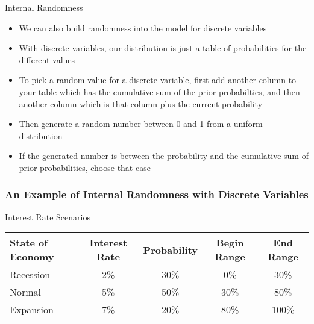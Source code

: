 \documentclass[handout, 11pt]{beamer}
\begin{document}
\begin{section}{Internal Randomness}
\begin{frame}
\begin{itemize}
\item We can also build randomness into the model for discrete variables
\vfill
\item With discrete variables, our distribution is just a table of probabilities for the different values
\vfill
\item To pick a random value for a discrete variable, first add another column to your table which has the cumulative sum of the prior probabilties, and then another column which is that column plus the current probability
\vfill
\item Then generate a random number between 0 and 1 from a uniform distribution
\vfill
\item If the generated number is between the probability and the cumulative sum of prior probabilities, choose that case
\end{itemize}
\end{frame}
\begin{frame}
\frametitle{An Example of Internal Randomness with Discrete Variables}
\small
\begin{block}{Interest Rate Scenarios}
\begin{center}
\begin{tabular}{L{2cm}|cccc}
State of Economy & Interest Rate & Probability & Begin Range & End Range\\

\midrule
Recession & 2\% & 30\% & 0\% & 30\%\\
Normal & 5\% & 50\% & 30\% & 80\%\\
Expansion & 7\% & 20\% & 80\% & 100\%\\


\end{tabular}
\end{center}
\end{block}
\end{frame}
\end{section}
\end{document}
